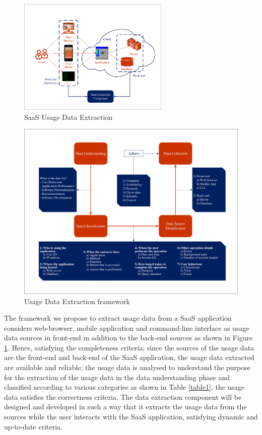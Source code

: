\documentclass[a4paper,twoside]{article}
\begin{document}
\begin{figure}[H]
 \centering
 \includegraphics[width = 7.2cm]{SaaS_Data_Extraction.pdf}
 \caption{SaaS Usage Data Extraction}
 \label{fig:fig3}
\end{figure}

\begin{figure}[h!]
 \centering
 \includegraphics[width = 15.4cm]{Usage_Data_Extraction_Framework.pdf}
 \caption{Usage Data Extraction framework}
 \label{fig:fig4}
\end{figure}

The framework we propose to extract usage data from a SaaS application considers web-browser, mobile application and command-line interface as usage data sources in front-end in addition to the back-end sources as shown in Figure \ref{fig:fig3}. Hence, satisfying the completeness criteria; since the sources of the usage data are the front-end and back-end of the SaaS application, the usage data extracted are available and reliable; the usage data is analysed to understand the purpose for the extraction of the usage data in the data understanding phase and classified according to various categories as shown in Table \ref{table1}, the usage data satisfies the correctness criteria. The data extraction component will be designed and developed in such a way that it extracts the usage data from the sources while the user interacts with the SaaS application, satisfying dynamic and up-to-date criteria. 
\end{document}
